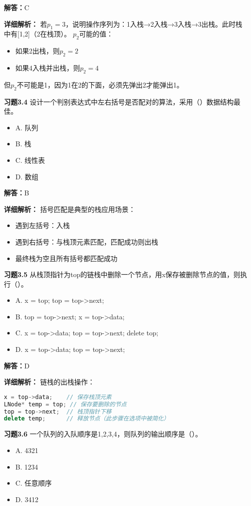 \documentclass[12pt,a4paper]{amsart}
\begin{document}
\textbf{解答：}C

\textbf{详细解析：}
若$p_1=3$，说明操作序列为：1入栈→2入栈→3入栈→3出栈。此时栈中有[1,2]（2在栈顶）。
$p_2$可能的值：
\begin{itemize}
\item 如果2出栈，则$p_2=2$
\item 如果4入栈并出栈，则$p_2=4$
\end{itemize}
但$p_2$不可能是1，因为1在2的下面，必须先弹出2才能弹出1。

\textbf{习题3.4} 设计一个判别表达式中左右括号是否配对的算法，采用（\quad）数据结构最佳。
\begin{itemize}
\item A. 队列
\item B. 栈
\item C. 线性表
\item D. 数组
\end{itemize}

\textbf{解答：}B

\textbf{详细解析：}
括号匹配是典型的栈应用场景：
\begin{itemize}
\item 遇到左括号：入栈
\item 遇到右括号：与栈顶元素匹配，匹配成功则出栈
\item 最终栈为空且所有括号都匹配成功
\end{itemize}

\textbf{习题3.5} 从栈顶指针为top的链栈中删除一个节点，用x保存被删除节点的值，则执行（\quad）。
\begin{itemize}
\item A. x = top; top = top->next;
\item B. top = top->next; x = top->data;
\item C. x = top->data; top = top->next; delete top;
\item D. x = top->data; top = top->next;
\end{itemize}

\textbf{解答：}D

\textbf{详细解析：}
链栈的出栈操作：
\begin{lstlisting}[language=C++]
x = top->data;    // 保存栈顶元素
LNode* temp = top; // 保存要删除的节点
top = top->next;  // 栈顶指针下移
delete temp;      // 释放节点（此步骤在选项中被简化）
\end{lstlisting}

\textbf{习题3.6} 一个队列的入队顺序是1,2,3,4，则队列的输出顺序是（\quad）。
\begin{itemize}
\item A. 4321
\item B. 1234
\item C. 任意顺序
\item D. 3412
\end{itemize}
\end{document}
